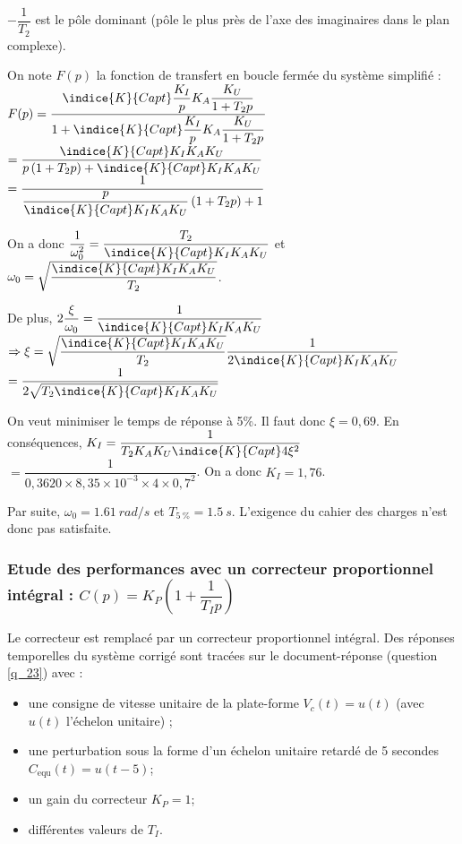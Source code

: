 \ifprof
\begin{corrige}
$-\dfrac{1}{T_2}$ est le pôle dominant (pôle le plus près de l'axe des imaginaires dans le plan complexe). 

On note $F(p)$ la fonction de transfert en boucle fermée du système simplifié : 
$F(p) = \dfrac{\indice{K}{Capt} \dfrac{K_I}{p} K_A \dfrac{K_U}{1+T_2 p}}{1+\indice{K}{Capt} \dfrac{K_I}{p} K_A \dfrac{K_U}{1+T_2 p}}$
$= \dfrac{\indice{K}{Capt} K_I K_A K_U}{p\left(1+T_2 p\right)+\indice{K}{Capt} K_I K_AK_U}$
$= \dfrac{1}{\dfrac{p}{\indice{K}{Capt} K_I K_AK_U}\left(1+T_2 p\right)+1}$

On a donc $\dfrac{1}{\omega_0^2} = \dfrac{T_2 }{\indice{K}{Capt} K_I K_AK_U}$ et 
$\omega_0 = \sqrt{\dfrac{\indice{K}{Capt} K_I K_AK_U}{T_2 }}$.


De plus, 
$2\dfrac{\xi}{\omega_0} = \dfrac{1}{\indice{K}{Capt} K_I K_AK_U}$ 
$\Rightarrow \xi = \sqrt{\dfrac{\indice{K}{Capt} K_I K_AK_U}{T_2 }}\dfrac{1}{2\indice{K}{Capt} K_I K_AK_U} $
$ = \dfrac{1}{2\sqrt{T_2 \indice{K}{Capt} K_I K_AK_U}} $

On veut minimiser le temps de réponse à 5\%. Il faut donc $\xi=0,69$. 
En conséquences, $ K_I = \dfrac{1}{T_2 K_AK_U \indice{K}{Capt}  4\xi^2} $ $=\dfrac{1}{0,36 20 \times 8,3  5 \times 10^{-3} \times 4\times 0,7^2}$. On a donc 
$ K_I = 1,76$.

Par suite, $\omega_0 = \SI{1,61}{rad/s}$ et $T_{\SI{5}{\%}} = \SI{1,5}{s}$. 
L'exigence du cahier des charges n'est donc pas satisfaite.


\end{corrige}
\else
\fi



\subsubsection{Etude des performances avec un correcteur proportionnel intégral : $C(p)={K_P}\left(1+\dfrac{1}{T_I p}\right)$}

Le correcteur est remplacé par un correcteur proportionnel intégral. Des réponses temporelles du système corrigé sont tracées sur le document-réponse (question \ref{q_23}) avec :
\begin{itemize}
\item une consigne de vitesse unitaire de la plate-forme $V_c (t)= u(t)$ (avec $u(t)$ l'échelon unitaire) ;
\item une perturbation sous la forme d'un échelon unitaire retardé de 5 secondes $C_{\text{equ}} (t) = u(t - 5)$;
\item un gain du correcteur $K_P = 1$;
\item différentes valeurs de $T_I$.
\end{itemize}


